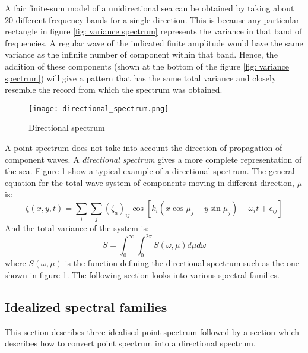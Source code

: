A fair finite-sum model of a unidirectional sea can be obtained by taking about
20 different frequency bands for a single direction. This is because any
particular rectangle in figure \ref{fig: variance spectrum} represents the
variance in that band of frequencies. A regular wave of the indicated finite
amplitude would have the same variance as the infinite number of component
within that band. Hence, the addition of these components (shown at the bottom
of the figure \ref{fig: variance spectrum}) will give a pattern that has the
same total variance and closely resemble the record from which the spectrum was
obtained.

\begin{figure}
  \centering
  \texttt{[image: directional\_spectrum.png]}
  \caption{Directional spectrum}
  \label{fig: directional spectrum}
\end{figure}

A point spectrum does not take into account the direction of propagation of
component waves. A \textit{directional spectrum} gives a more complete
representation of the sea. Figure \ref{fig: directional spectrum} show a typical
example of a directional spectrum. The general equation for the total wave
system of components moving in different direction, $\mu$ is:
\begin{equation}
  \zeta(x,y,t) = \sum _i \sum _j (\zeta_a)_{ij} \cos[k_i (x \cos \mu_j + 
  y \sin \mu_j) - \omega_i t + \epsilon_{ij}]
  \label{eq: equation of ocean wave system}
\end{equation}
And the total variance of the system is:
\begin{equation}
  S = \int_{0}^{\infty} \int_{0}^{2\pi} S(\omega, \mu) d\mu d\omega
  \label{eq: total variance for ocean wave system}
\end{equation}
where $S(\omega, \mu)$ is the function defining the directional spectrum such as
the one shown in figure \ref{fig: directional spectrum}. The following section
looks into various spectral families.

\subsection{Idealized spectral families}

This section describes three idealised point spectrum followed by a section
which describes how to convert point spectrum into a directional spectrum.

